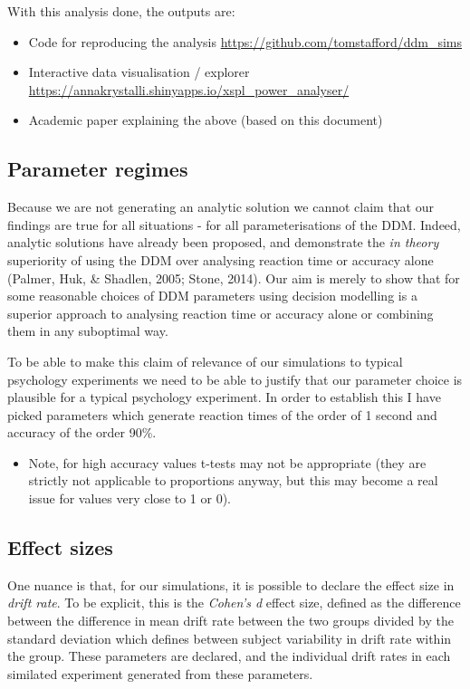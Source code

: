 \documentclass[floatsintext,doc]{apa6}
\providecommand{\tightlist}{%
  \setlength{\itemsep}{0pt}\setlength{\parskip}{0pt}}
\theoremstyle{definition}
\theoremstyle{definition}
\theoremstyle{definition}
\theoremstyle{remark}
\begin{document}
With this analysis done, the outputs are:

\begin{itemize}
\tightlist
\item
  Code for reproducing the analysis
  \url{https://github.com/tomstafford/ddm_sims}
\item
  Interactive data visualisation / explorer
  \url{https://annakrystalli.shinyapps.io/xspl_power_analyser/}
\item
  Academic paper explaining the above (based on this document)
\end{itemize}

\subsection{Parameter regimes}\label{parameter-regimes}

Because we are not generating an analytic solution we cannot claim that
our findings are true for all situations - for all parameterisations of
the DDM. Indeed, analytic solutions have already been proposed, and
demonstrate the \emph{in theory} superiority of using the DDM over
analysing reaction time or accuracy alone (Palmer, Huk, \& Shadlen,
2005; Stone, 2014). Our aim is merely to show that for some reasonable
choices of DDM parameters using decision modelling is a superior
approach to analysing reaction time or accuracy alone or combining them
in any suboptimal way.

To be able to make this claim of relevance of our simulations to typical
psychology experiments we need to be able to justify that our parameter
choice is plausible for a typical psychology experiment. In order to
establish this I have picked parameters which generate reaction times of
the order of 1 second and accuracy of the order 90\%.

\begin{itemize}
\tightlist
\item
  Note, for high accuracy values t-tests may not be appropriate (they
  are strictly not applicable to proportions anyway, but this may become
  a real issue for values very close to 1 or 0).
\end{itemize}

\subsection{Effect sizes}\label{effect-sizes}

One nuance is that, for our simulations, it is possible to declare the
effect size in \emph{drift rate}. To be explicit, this is the
\emph{Cohen's d} effect size, defined as the difference between the
difference in mean drift rate between the two groups divided by the
standard deviation which defines between subject variability in drift
rate within the group. These parameters are declared, and the individual
drift rates in each similated experiment generated from these
parameters.
\end{document}

